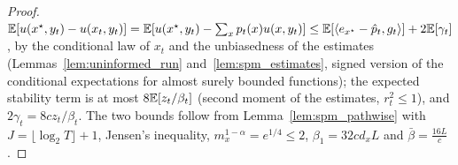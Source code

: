 \begin{proof}
  \leanok
  $\mathbb{E}[u(x^\star, y_t) - u(x_t, y_t)] = \mathbb{E}[u(x^\star, y_t) - \sum_x p_t(x)u(x, y_t)] \le \mathbb{E}[\langle
  e_{x^\star} - \hat p_t, g_t\rangle] + 2\mathbb{E}[\gamma_t]$, by the conditional law of $x_t$ and the
  unbiasedness of the estimates (Lemmas~\ref{lem:uninformed_run} and~\ref{lem:spm_estimates},
  signed version of the conditional expectations for almost surely bounded functions); the
  expected stability term is at most $8\mathbb{E}[z_t/\beta_t]$ (second moment of the estimates, $r_t^2
  \le 1$), and $2\gamma_t = 8c z_t/\beta_t$. The two bounds follow from Lemma~\ref{lem:spm_pathwise}
  with $J = \lfloor\log_2 T\rfloor + 1$, Jensen's inequality, $m_x^{1-\alpha} = e^{1/4} \le 2$,
  $\beta_1 = 32 c d_x L$ and $\bar\beta = \frac{16L}{c}$.
\end{proof}

